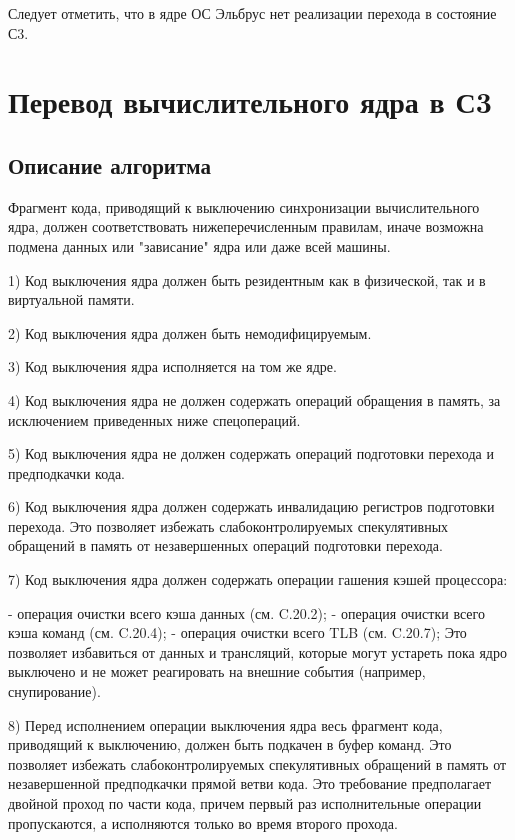 \documentclass{article}
\begin{document}
Следует отметить, что в ядре ОС Эльбрус нет реализации перехода в состояние С3.


\newpage
\section{Перевод вычислительного ядра в С3 }

\subsection{Описание алгоритма}

Фрагмент кода, приводящий к выключению синхронизации вычислительного ядра,
должен соответствовать нижеперечисленным правилам, иначе возможна подмена данных
или "зависание" ядра или даже всей машины.

1) Код выключения ядра должен быть резидентным как в физической, так и в виртуальной памяти.

2) Код выключения ядра должен быть немодифицируемым.

3) Код выключения ядра исполняется на том же ядре.

4) Код выключения ядра не должен содержать операций обращения в память, за
исключением приведенных ниже спецопераций.

5) Код выключения ядра не должен содержать операций подготовки перехода и
предподкачки кода.

6) Код выключения ядра должен содержать инвалидацию регистров подготовки
перехода. Это позволяет избежать слабоконтролируемых спекулятивных обращений в
память от незавершенных операций подготовки перехода.

7) Код выключения ядра должен содержать операции гашения кэшей процессора:

	- операция очистки всего кэша данных (см. C.20.2);
	       - операция очистки всего кэша команд (см. C.20.4);
	      - операция очистки всего TLB (см. C.20.7);
Это позволяет избавиться от данных и трансляций, которые могут устареть пока
ядро выключено и не может реагировать на внешние события (например,
снупирование).

8) Перед исполнением операции выключения ядра весь фрагмент кода, приводящий к
выключению, должен быть подкачен в буфер команд. Это позволяет избежать
слабоконтролируемых спекулятивных обращений в память от незавершенной
предподкачки прямой ветви кода. Это требование предполагает двойной проход по
части кода, причем первый раз исполнительные операции пропускаются, а
исполняются только во время второго прохода.
\end{document}
